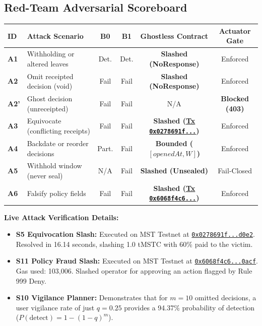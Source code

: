 \documentclass[11pt,a4paper]{article}
\begin{document}
\subsection{Red-Team Adversarial Scoreboard}
\begin{table}[h!]
\small
\centering
\begin{tabularx}{\textwidth}{lXcccc}
\toprule
\textbf{ID} & \textbf{Attack Scenario} & \textbf{B0} & \textbf{B1} & \textbf{Ghostless Contract} & \textbf{Actuator Gate} \\
\midrule
\textbf{A1} & Withholding or altered leaves & Det. & Det. & \textbf{Slashed (NoResponse)} & Enforced \\
\textbf{A2} & Omit receipted decision (void) & Fail & Fail & \textbf{Slashed (NoResponse)} & Enforced \\
\textbf{A2'} & Ghost decision (unreceipted) & Fail & Fail & N/A & \textbf{Blocked (403)} \\
\textbf{A3} & Equivocate (conflicting receipts) & Fail & Fail & \textbf{Slashed (\href{https://mstscan.com/tx/0x0278691ff5d0fa3c139cba38ed5757a2ea38f8deaba9653938f4976d1a72d0e2}{Tx \texttt{0x0278691f...}})} & Enforced \\
\textbf{A4} & Backdate or reorder decisions & Part. & Fail & \textbf{Bounded ($[openedAt, W]$)} & Enforced \\
\textbf{A5} & Withhold window (never seal) & N/A & Fail & \textbf{Slashed (Unsealed)} & Fail-Closed \\
\textbf{A6} & Falsify policy fields & Fail & Fail & \textbf{Slashed (\href{https://mstscan.com/tx/0x6068f4c661d9170c8fcf38b789922f37412bacc9bd1d5e8fc983edf224fb0acf}{Tx \texttt{0x6068f4c6...}})} & Enforced \\
\bottomrule
\end{tabularx}
\end{table}

\noindent \textbf{Live Attack Verification Details:}
\begin{itemize}[leftmargin=1.5em]
    \item \textbf{S5 Equivocation Slash:} Executed on MST Testnet at \href{https://mstscan.com/tx/0x0278691ff5d0fa3c139cba38ed5757a2ea38f8deaba9653938f4976d1a72d0e2}{\texttt{0x0278691f...d0e2}}. Resolved in 16.14 seconds, slashing 1.0 tMSTC with 60\% paid to the victim.
    \item \textbf{S11 Policy Fraud Slash:} Executed on MST Testnet at \href{https://mstscan.com/tx/0x6068f4c661d9170c8fcf38b789922f37412bacc9bd1d5e8fc983edf224fb0acf}{\texttt{0x6068f4c6...0acf}}. Gas used: 103,006. Slashed operator for approving an action flagged by Rule 999 Deny.
    \item \textbf{S10 Vigilance Planner:} Demonstrates that for $m=10$ omitted decisions, a user vigilance rate of just $q=0.25$ provides a 94.37\% probability of detection ($P(\text{detect}) = 1 - (1-q)^m$).
\end{itemize}
\end{document}
